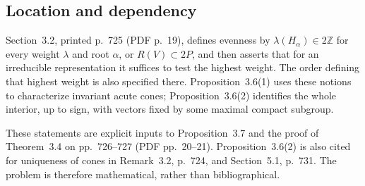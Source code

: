\documentclass[10pt]{article}
\begin{document}
\subsection*{Location and dependency}
Section 3.2, printed p. 725 (PDF p. 19), defines evenness by \(\lambda(H_\alpha)\in2\mathbb Z\) for every weight \(\lambda\) and root \(\alpha\), or \(R(V)\subset2P\), and then asserts that for an irreducible representation it suffices to test the highest weight. The order defining that highest weight is also specified there. Proposition 3.6(1) uses these notions to characterize invariant acute cones; Proposition 3.6(2) identifies the whole interior, up to sign, with vectors fixed by some maximal compact subgroup.\par
These statements are explicit inputs to Proposition 3.7 and the proof of Theorem 3.4 on pp. 726–727 (PDF pp. 20–21). Proposition 3.6(2) is also cited for uniqueness of cones in Remark 3.2, p. 724, and Section 5.1, p. 731. The problem is therefore mathematical, rather than bibliographical.\par
\end{document}
